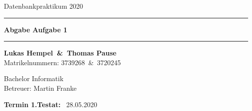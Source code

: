 \begin{titlepage}
    \begin{center}

        \vspace{\fill}
        \huge{Datenbankpraktikum 2020}\\

        \vspace{20pt}

        \hrule
        \vspace{26pt}
        \Huge \textbf{Abgabe Aufgabe 1}
        \vspace{20pt}
        \hrule

        \vspace{10pt}

        \vspace{\fill}
        \Large{\textbf{Lukas Hempel~\&~Thomas Pause}} %
        ~\\
        \Large{Matrikelnummern: 3739268~\&~3720245}

        \Large{Bachelor Informatik}
        ~\\
        \Large{Betreuer: Martin Franke}
        \vspace{\fill}

    \end{center}

    \begin{flushright}

        \Large{\textbf{Termin 1.Testat:}} ~\Large{28.05.2020}
    \end{flushright}

\end{titlepage}
